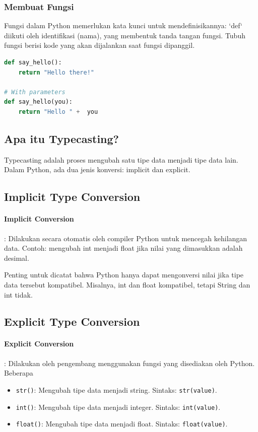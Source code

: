 \documentclass{article}
\begin{document}
\subsubsection{Membuat Fungsi}
Fungsi dalam Python memerlukan kata kunci untuk mendefinisikannya: `def` diikuti oleh identifikasi (nama), yang membentuk tanda tangan fungsi. Tubuh fungsi berisi kode yang akan dijalankan saat fungsi dipanggil.
\begin{lstlisting}[language=Python, caption={}, captionpos=b]
def say_hello():
    return "Hello there!"

# With parameters
def say_hello(you):
    return "Hello " +  you
\end{lstlisting}

\subsection{Apa itu Typecasting?}
Typecasting adalah proses mengubah satu tipe data menjadi tipe data lain. Dalam Python, ada dua jenis konversi: implicit dan explicit.

\subsection{Implicit Type Conversion}
\paragraph{Implicit Conversion}: Dilakukan secara otomatis oleh compiler Python untuk mencegah kehilangan data. Contoh: mengubah int menjadi float jika nilai yang dimasukkan adalah desimal.

Penting untuk dicatat bahwa Python hanya dapat mengonversi nilai jika tipe data tersebut kompatibel. Misalnya, int dan float kompatibel, tetapi String dan int tidak.

\subsection{Explicit Type Conversion}
\paragraph{Explicit Conversion}: Dilakukan oleh pengembang menggunakan fungsi yang disediakan oleh Python. Beberapa
\begin{itemize}
    \item \verb|str()|: Mengubah tipe data menjadi string. Sintaks: \verb|str(value)|.
    \item \verb|int()|: Mengubah tipe data menjadi integer. Sintaks: \verb|int(value)|.
    \item \verb|float()|: Mengubah tipe data menjadi float. Sintaks: \verb|float(value)|.
\end{itemize}
\end{document}
